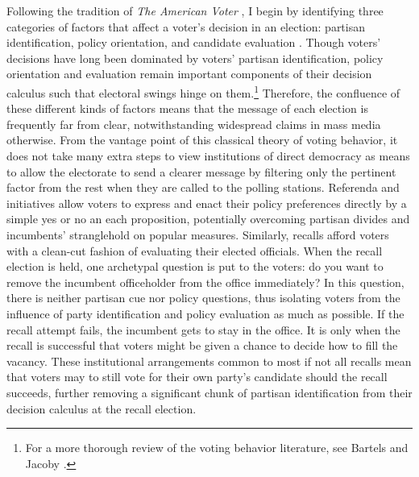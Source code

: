 \documentclass[hyphens, crop=false]{standalone}
\begin{document}
		
		Following the tradition of \textit{The American Voter}
		\autocite*{campbellAmericanVoter1960},
		I begin by identifying three categories of factors that affect a voter's decision in an election:
		partisan identification, policy orientation, and candidate evaluation
		\autocites[59]{campbellAmericanVoter1960}[28]{lewis-beckAmericanVoterRevisited2008}.
		Though voters' decisions have long been dominated by voters' partisan identification,
		policy orientation and evaluation remain important components of their decision calculus such that electoral swings hinge on them.\footnote{For a more thorough review of the voting behavior literature, see
			Bartels \autocite*{bartelsStudyElectoralBehavior2010}
			and
			Jacoby \autocite*{jacobyAmericanVoter2010}.
		}
		Therefore,
		the confluence of these different kinds of factors means that the message of each election is frequently far from clear, notwithstanding widespread claims in mass media otherwise.
		From the vantage point of this classical theory of voting behavior,
		it does not take many extra steps to view institutions of direct democracy as means to allow the electorate to send a clearer message
		by filtering only the pertinent factor from the rest when they are called to the polling stations.
		Referenda and initiatives allow voters to express and enact their policy preferences directly by a simple yes or no an each proposition,
		potentially overcoming partisan divides and incumbents' stranglehold on popular measures.
		Similarly,
		recalls afford voters with a clean-cut fashion of evaluating their elected officials.
		When the recall election is held, one archetypal question is put to the voters:
		do you want to remove the incumbent officeholder from the office immediately?
		In this question,
		there is neither partisan cue nor policy questions,
		thus isolating voters from the influence of party identification and policy evaluation as much as possible.
		If the recall attempt fails, the incumbent gets to stay in the office.
		It is only when the recall is successful that voters might be given a chance to decide how to fill the vacancy.
		These institutional arrangements common to most if not all recalls mean that voters may to still vote for their own party's candidate should the recall succeeds,
		further removing a significant chunk of partisan identification from their decision calculus at the recall election.
		
\end{document}
